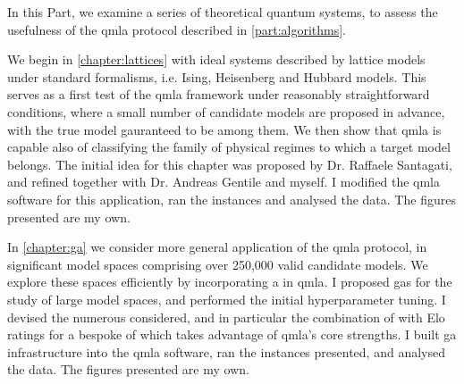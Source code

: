 \glsresetall
In this Part, we examine a series of theoretical quantum systems, 
    to assess the usefulness of the \gls{qmla} protocol described in \cref{part:algorithms}. 
\par 
\vspace{1cm}

We begin in \cref{chapter:lattices} with ideal systems described by lattice models 
    under standard formalisms, i.e. Ising, Heisenberg and Hubbard models. 
This serves as a first test of the \gls{qmla} framework under reasonably straightforward
    conditions, where a small number of candidate models are proposed in advance, 
    with the \gls{true model} gauranteed to be among them. 
We then show that \gls{qmla} is capable also of classifying the family of 
    physical regimes to which a target model belongs. 
The initial idea for this chapter was proposed by Dr. Raffaele Santagati, 
    and refined together with Dr. Andreas Gentile and myself. 
I modified the \gls{qmla} software for this application, 
    ran the \glspl{instance} and analysed the data. 
The figures presented are my own.

\par 
\vspace{1cm}
In \cref{chapter:ga} we consider more general application of the \gls{qmla} protocol, 
    in significant model spaces comprising over 250,000 valid candidate models. 
We explore these spaces efficiently by incorporating a  in \gls{qmla}. 
I proposed \glspl{ga} for the study of large model spaces, 
    and performed the initial \gls{hyperparameter} tuning. 
I devised the numerous  considered, 
    and in particular the combination of 
    with Elo ratings for a bespoke \gls{of} which takes advantage of \gls{qmla}'s core strengths. 
I built \gls{ga} infrastructure into the \gls{qmla} software, 
    ran the \glspl{instance} presented, and analysed the data.
The figures presented are my own. 
